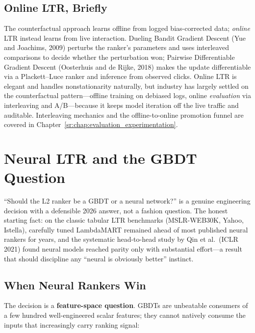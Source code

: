 \subsection{Online LTR, Briefly}

The counterfactual approach learns offline from logged bias-corrected data; \textit{online} LTR instead learns from live interaction. Dueling Bandit Gradient Descent (Yue and Joachims, 2009) perturbs the ranker's parameters and uses interleaved comparisons to decide whether the perturbation won; Pairwise Differentiable Gradient Descent (Oosterhuis and de Rijke, 2018) makes the update differentiable via a Plackett--Luce ranker and inference from observed clicks. Online LTR is elegant and handles nonstationarity naturally, but industry has largely settled on the counterfactual pattern---offline training on debiased logs, online \textit{evaluation} via interleaving and A/B---because it keeps model iteration off the live traffic and auditable. Interleaving mechanics and the offline-to-online promotion funnel are covered in Chapter~\ref{sr:chap:evaluation_experimentation}.

\section{Neural LTR and the GBDT Question}
\label{sr:sec:neural_ltr}

``Should the L2 ranker be a GBDT or a neural network?'' is a genuine engineering decision with a defensible 2026 answer, not a fashion question. The honest starting fact: on the classic tabular LTR benchmarks (MSLR-WEB30K, Yahoo, Istella), carefully tuned LambdaMART remained ahead of most published neural rankers for years, and the systematic head-to-head study by Qin et al.\ (ICLR 2021) found neural models reached parity only with substantial effort---a result that should discipline any ``neural is obviously better'' instinct.

\subsection{When Neural Rankers Win}

The decision is a \textbf{feature-space question}. GBDTs are unbeatable consumers of a few hundred well-engineered scalar features; they cannot natively consume the inputs that increasingly carry ranking signal:

